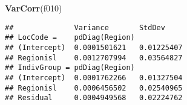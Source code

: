 \documentclass[]{article}
\newenvironment{Shaded}{\begin{snugshade}}{\end{snugshade}}
\newcommand{\KeywordTok}[1]{\textcolor[rgb]{0.13,0.29,0.53}{\textbf{#1}}}
\newcommand{\NormalTok}[1]{#1}
\begin{document}
\begin{Shaded}
\begin{Highlighting}[]
\KeywordTok{VarCorr}\NormalTok{(f010)}
\end{Highlighting}
\end{Shaded}

\begin{verbatim}
##              Variance       StdDev    
## LocCode =    pdDiag(Region)           
## (Intercept)  0.0001501621   0.01225407
## Regionisl    0.0012707994   0.03564827
## IndivGroup = pdDiag(Region)           
## (Intercept)  0.0001762266   0.01327504
## Regionisl    0.0006456502   0.02540965
## Residual     0.0004949568   0.02224762
\end{verbatim}
\end{document}
